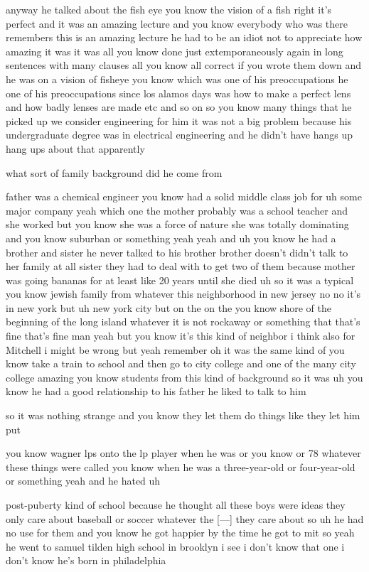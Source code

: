 \begin{description}
anyway he talked about the fish eye you know the vision of a fish right
it's perfect and it was an amazing lecture and you know everybody who was
there remembers this is an amazing lecture he had to be an idiot not to
appreciate how amazing it was it was all you know done just
extemporaneously again in long sentences with many clauses all you know
all correct if you wrote them down and he was on a vision of fisheye you
know which was one of his preoccupations he one of his preoccupations
since los alamos days was how to make a perfect lens and how badly lenses
are made etc and so on so you know many things that he picked up we
consider engineering for him it was not a big problem because his
undergraduate degree was in electrical engineering and he didn't have
hangs up hang ups about that apparently

what sort of family background did he come from

father was a chemical engineer you know had a solid middle class job for uh some major company yeah which one the mother probably was a school teacher and she worked but you know she was a force of nature she was totally dominating and you know suburban or something yeah yeah and uh you know he had a brother and sister he never talked to his brother brother doesn't didn't talk to her family at all sister they had to deal with to get two of them because mother was going bananas for at least like 20 years until she died uh so it was a typical you know jewish family from whatever this neighborhood in new jersey no no it's in new york but uh new york city but on the on the you know shore of the beginning of the long island whatever it is not rockaway or something that that's fine that's fine man yeah but you know it's this kind of neighbor i think also for Mitchell i might be wrong but yeah remember oh it was the same kind of you know take a train to school and then go to city college and one of the many city college amazing you know students from this kind of background so it was uh you know he had a good relationship to his father he liked to talk to him

so it was nothing strange and you know they let them do things like they let him put

you know wagner lps onto the lp player when he was or you know or 78 whatever these things were called you know when he was a three-year-old or four-year-old or something yeah and he hated uh

post-puberty kind of school because he thought all these boys were ideas they only care about baseball or soccer whatever the [---] they care about so uh he had no use for them and you know he got happier by the time he got to mit so yeah he went to samuel tilden high school in brooklyn i see i don't know that one i don't know he's born in philadelphia


\end{description}
